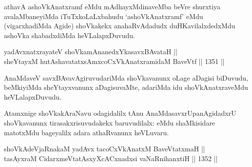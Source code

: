 \begin{artha}
athavA ashoVkAnatxramf eMdu mAdhayxMdinaveMba beVre shurxtiya avalaMbaneyiMda iTuTxkoLaLxbahudu `ashoVkAnatxramf' eMdu (vigarxhadiMda Agide) shoVkakekx anahaRvAdadudx duHKavilalxdedxMdu ashoVka shabadxdiMda heVLalapxDuvudu.
\end{artha}


\begin{shl}
yadAvx\footnotemark[1]\s natxrayateV shoVkamAnanedxYkasavxBAvataH || \\
sheYtayxM hutAshavatatxsAmxcoCxVkAnatxramidaM BaveVtf \hfill || 1351 ||  
\end{shl}

\begin{artha}
AnaMdaveV savxBAvavAgiruvudariMda shoVkavanunx oLage aDagisi biDuvudu, beMkiyiMda sheYtayxvanunx aDagisuvaMte, adariMda idu shoVkAnatxraveMdu heVLalapxDuvudu.
\end{artha}

\begin{artha}
Atamxnige shoVkakAraNavu odagidalilx tAnu AnaMdasavxrUpanAgidadxrU shoVkavanunx tirasakxrisuvudakekx baruvudilalx: eMdu shaMkisidare matotxMdu bageyalilx adara athaRvanunx heVLuvaru.
\end{artha}

\begin{shl}
shoVkAdeVjaRnakaM yadAvx tacoCxV\footnotemark[2]kAnatxM BaveVtatxmaH || \\
tasAyxraM CidarxmeVtatAsxyXcACxnadxsi vaNaRnihanxtiH \hfill || 1352 ||  
\end{shl}

